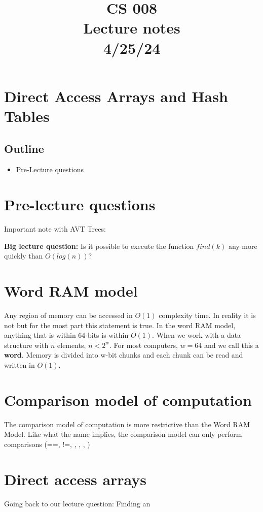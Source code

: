 \documentclass[11pt,a4paper,english]{paper}
\begin{document}
\title{CS 008 \\ Lecture notes \\ 4/25/24}
\maketitle

\section{Direct Access Arrays and Hash Tables}

\subsection{Outline}

\begin{itemize}

  \item Pre-Lecture questions

\end{itemize}


\section{Pre-lecture questions}

Important note with AVT Trees:
\noindent 

\bigskip
\noindent \textbf{Big lecture question:} Is it possible to execute the function $find(k)$ any more quickly than $O(log(n))$?

\section{Word RAM model}

Any region of memory can be accessed in $O(1)$ complexity time. In reality it is not but for the most part this statement is true. In the word RAM model, anything that is within 64-bits is within $O(1)$. When we work with a data structure with $n$ elements, $n < 2^{w}$. For most computers, $w = 64$ and we call this a \textbf{word}. Memory is divided into w-bit chunks and each chunk can be read and written in $O(1)$.

\section{Comparison model of computation}

The comparison model of computation is more restrictive than the Word RAM Model. Like what the name implies, the comparison model can only perform comparisons (==, !=, \lesser, \greater, \leq, \geq)

\section{Direct access arrays}

Going back to our lecture question: Finding an 
\end{document}
